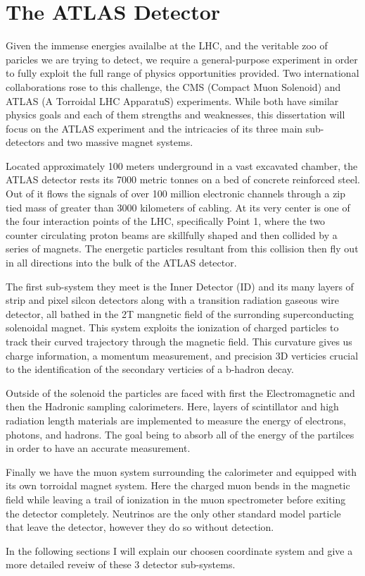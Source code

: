 \chapter{The ATLAS Detector} \label{chap:atlas}

Given the immense energies availalbe at the LHC, and the veritable zoo of
paricles we are trying to detect, we require a general-purpose experiment in
order to fully exploit the full range of physics opportunities provided.  Two
international collaborations rose to this challenge, the CMS (Compact Muon
Solenoid) and ATLAS (A Torroidal LHC ApparatuS) experiments.  While both have
similar physics goals and each of them strengths and weaknesses, this
dissertation will focus on the ATLAS experiment and the intricacies of its three
main sub-detectors and two massive magnet systems.  

Located approximately 100 meters underground in a vast excavated chamber, the
ATLAS detector rests its 7000 metric tonnes on a bed of concrete reinforced
steel.  Out of it flows the signals of over 100 million electronic channels
through a zip tied mass of greater than 3000 kilometers of cabling.  At its very
center is one of the four interaction points of the LHC, specifically Point 1,
where the two counter circulating proton beams are skillfully shaped and then
collided by a series of magnets.  The energetic particles resultant from this
collision then fly out in all directions into the bulk of the ATLAS detector.

The first sub-system they meet is the Inner Detector (ID) and its many layers of
strip and pixel silcon detectors along with a transition radiation gaseous wire
detector, all bathed in the 2T mangnetic field of the surronding superconducting
solenoidal magnet.  This system exploits the ionization of charged particles to
track their curved trajectory through the magnetic field.  This curvature gives
us charge information, a momentum measurement, and precision 3D verticies
crucial to the identification of the secondary verticies of a b-hadron decay. 

Outside of the solenoid the particles are faced with first the Electromagnetic
and then the Hadronic sampling calorimeters. Here, layers of scintillator and 
high radiation length materials are implemented to measure the energy of
electrons, photons, and hadrons.  The goal being to absorb all of the energy of
the partilces in order to have an accurate measurement.

Finally we have the muon system surrounding the calorimeter and equipped with
its own torroidal magnet system.  Here the charged muon bends in the magnetic
field while leaving a trail of ionization in the muon spectrometer before
exiting the detector completely.  Neutrinos are the only other standard model
particle that leave the detector, however they do so without detection.

In the following sections I will explain our choosen coordinate system and give 
a more detailed reveiw of these 3 detector sub-systems.  

 
 


